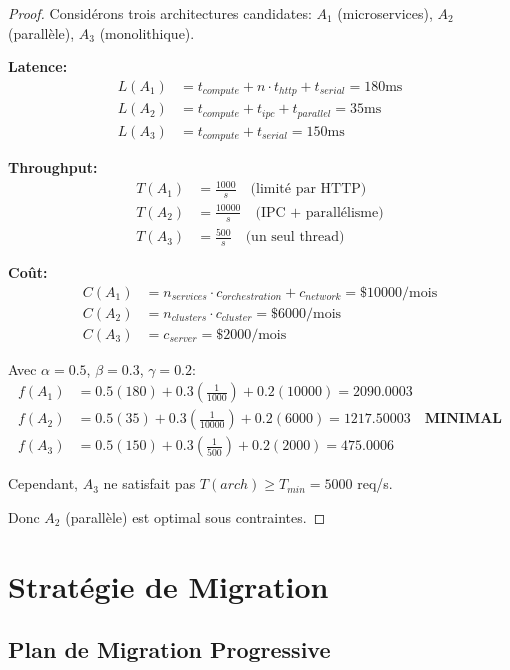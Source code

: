 \documentclass[12pt,a4paper]{article}
\begin{document}
\begin{proof}
Considérons trois architectures candidates: $A_1$ (microservices), $A_2$ (parallèle), $A_3$ (monolithique).

\textbf{Latence:}
\begin{align*}
L(A_1) &= t_{compute} + n \cdot t_{http} + t_{serial} = 180\text{ms} \\
L(A_2) &= t_{compute} + t_{ipc} + t_{parallel} = 35\text{ms} \\
L(A_3) &= t_{compute} + t_{serial} = 150\text{ms}
\end{align*}

\textbf{Throughput:}
\begin{align*}
T(A_1) &= \frac{1000}{s} \quad \text{(limité par HTTP)} \\
T(A_2) &= \frac{10000}{s} \quad \text{(IPC + parallélisme)} \\
T(A_3) &= \frac{500}{s} \quad \text{(un seul thread)}
\end{align*}

\textbf{Coût:}
\begin{align*}
C(A_1) &= n_{services} \cdot c_{orchestration} + c_{network} = \$10000/\text{mois} \\
C(A_2) &= n_{clusters} \cdot c_{cluster} = \$6000/\text{mois} \\
C(A_3) &= c_{server} = \$2000/\text{mois}
\end{align*}

Avec $\alpha = 0.5$, $\beta = 0.3$, $\gamma = 0.2$:
\begin{align*}
f(A_1) &= 0.5(180) + 0.3(\frac{1}{1000}) + 0.2(10000) = 2090.0003 \\
f(A_2) &= 0.5(35) + 0.3(\frac{1}{10000}) + 0.2(6000) = 1217.50003 \quad \textbf{MINIMAL} \\
f(A_3) &= 0.5(150) + 0.3(\frac{1}{500}) + 0.2(2000) = 475.0006
\end{align*}

Cependant, $A_3$ ne satisfait pas $T(arch) \geq T_{min} = 5000$ req/s.

Donc $A_2$ (parallèle) est optimal sous contraintes.
\end{proof}

\section{Stratégie de Migration}

\subsection{Plan de Migration Progressive}
\end{document}
